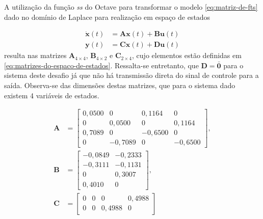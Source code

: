 A utilização da função \textit{ss} do Octave para transformar o modelo
\ref{eq:matriz-de-fts} dado no domínio de Laplace para realização em espaço de
estados

\begin{subequations}
    \label{eq:espaco-de-estados-continuo}
    \begin{align}
        \mathbf{\dot{x}}(t) & = \mathbf{A}\mathbf{x}(t) + \mathbf{B}\mathbf{u}(t)
        \label{eq:derivada-do-vetor-de-estados}                                   \\
        \mathbf{y}(t)       & = \mathbf{C}\mathbf{x}(t) + \mathbf{D}\mathbf{u}(t)
        \label{eq:saida-do-sistema-em-espaco-de-estados}
    \end{align}
\end{subequations} resulta nas matrizes $\mathbf{A}_{4\times 4}$,
$\mathbf{B}_{4\times 2}$ e $\mathbf{C}_{2\times 4}$, cujo elementos estão
definidas em \ref{eq:matrizes-do-espaco-de-estados}. Ressalta-se entretanto, que
$\mathbf{D} = \mathbf{\bar{0}}$ para o sistema deste desafio já que não há
transmissão direta do sinal de controle para a saída. Observa-se das dimensões
destas matrizes, que para o sistema dado existem 4 variáveis de estados.

\begin{subequations}
    \label{eq:matrizes-do-espaco-de-estados}
    \begin{align}
        \mathbf{A} & =
        \begin{bmatrix}
            \label{eq:matriz-a}
            0,0500 & 0       & 0,1164  & 0       \\
            0      & 0,0500  & 0       & 0,1164  \\
            0,7089 & 0       & -0,6500 & 0       \\
            0      & -0,7089 & 0       & -0,6500
        \end{bmatrix},  \\
        \mathbf{B} & =
        \begin{bmatrix}
            \label{eq:matriz-b}
            -0,0849 & -0,2333 \\
            -0,3111 & -0,1131 \\
            0       & 0,3007  \\
            0,4010  & 0
        \end{bmatrix}, \\
        \mathbf{C} & =
        \begin{bmatrix}
            \label{eq:matriz-c}
            0 & 0 & 0      & 0,4988 \\
            0 & 0 & 0,4988 & 0
        \end{bmatrix} 
    \end{align}
\end{subequations}

